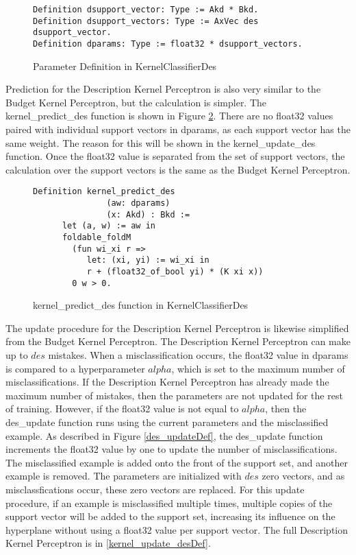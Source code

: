 \begin{figure}
    \caption{Parameter Definition in KernelClassifierDes}
    \label{KPDsupportDef}
    \begin{lstlisting}
Definition dsupport_vector: Type := Akd * Bkd.
Definition dsupport_vectors: Type := AxVec des dsupport_vector.
Definition dparams: Type := float32 * dsupport_vectors.
    \end{lstlisting}
\end{figure}

Prediction for the Description Kernel Perceptron is also very similar to the Budget Kernel Perceptron, but the calculation is simpler. The kernel\_predict\_des function is shown in Figure \ref{kernel_predict_desDef}. There are no float32 values paired with individual support vectors in dparams, as each support vector has the same weight. The reason for this will be shown in the kernel\_update\_des function. Once the float32 value is separated from the set of support vectors, the calculation over the support vectors is the same as the Budget Kernel Perceptron.

\begin{figure}
    \caption{kernel\_predict\_des function in KernelClassifierDes}
    \label{kernel_predict_desDef}
    \begin{lstlisting}
Definition kernel_predict_des
               (aw: dparams)
               (x: Akd) : Bkd :=
      let (a, w) := aw in
      foldable_foldM
        (fun wi_xi r =>
           let: (xi, yi) := wi_xi in 
           r + (float32_of_bool yi) * (K xi x))
        0 w > 0.
    \end{lstlisting}
\end{figure}

The update procedure for the Description Kernel Perceptron is likewise simplified from the Budget Kernel Perceptron. The Description Kernel Perceptron can make up to $des$ mistakes. When a misclassification occurs, the float32 value in dparams is compared to a hyperparameter $alpha$, which is set to the maximum number of misclassifications. If the Description Kernel Perceptron has already made the maximum number of mistakes, then the parameters are not updated for the rest of training. However, if the float32 value is not equal to $alpha$, then the des\_update function runs using the current parameters and the misclassified example. As described in Figure \ref{des_updateDef}, the des\_update function increments the float32 value by one to update the number of misclassifications. The misclassified example is added onto the front of the support set, and another example is removed. The parameters are initialized with $des$ zero vectors, and as misclassfications occur, these zero vectors are replaced. For this update procedure, if an example is misclassified multiple times, multiple copies of the support vector will be added to the support set, increasing its influence on the hyperplane without using a float32 value per support vector. The full Description Kernel Perceptron is in \ref{kernel_update_desDef}.

